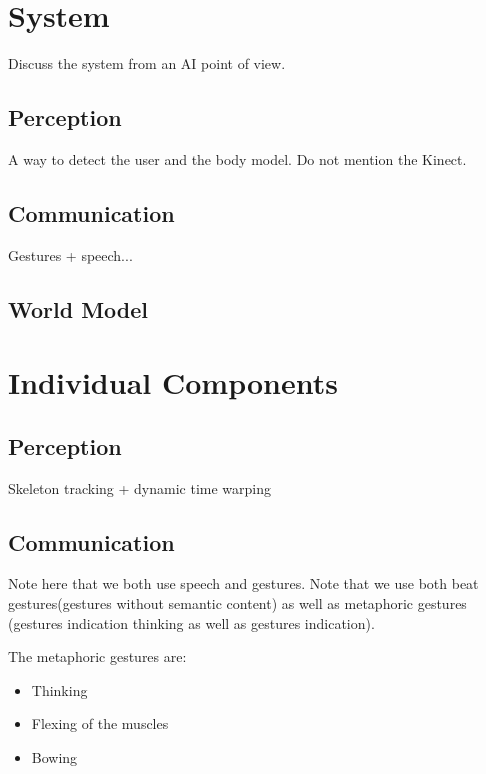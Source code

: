 \documentclass[10pt,a4paper,oneside]{scrartcl}
\begin{document}
\section{System}
Discuss the system from an AI point of view.

\subsection{Perception}
A way to detect the user and the body model. Do not mention the Kinect.

\subsection{Communication}
Gestures + speech...

\subsection{World Model}



\section{Individual Components}

\subsection{Perception}
Skeleton tracking + dynamic time warping

\subsection{Communication}
Note here that we both use speech and gestures. 
Note that we use both beat gestures(gestures without semantic content) as well as metaphoric gestures (gestures indication thinking as well as gestures indication). 

The metaphoric gestures are:
\begin{itemize}
  \item Thinking
  \item Flexing of the muscles
  \item Bowing
\end{itemize}
\end{document}
